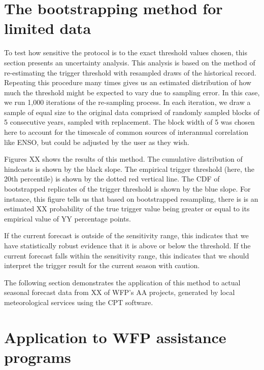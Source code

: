 \documentclass{ametsocV5}
\begin{document}
\section{The bootstrapping method for limited data}


To test how sensitive the protocol is to the exact threshold values chosen, this section presents an uncertainty analysis. This analysis is based on the method of re-estimating the trigger threshold with resampled draws of the historical record. Repeating this procedure many times gives us an estimated distribution of how much the threshold might be expected to vary due to sampling error. In this case, we run 1,000 iterations of the re-sampling process. In each iteration, we draw a sample of equal size to the original data comprised of randomly sampled blocks of 5 consecutive years, sampled with replacement. The block width of 5 was chosen here to account for the timescale of common sources of interannual correlation like ENSO, but could be adjusted by the user as they wish. 

Figures XX shows the results of this method. The cumulative distribution of hindcasts is shown by the black slope. The empirical trigger threshold (here, the 20th percentile) is shown by the dotted red vertical line. The CDF of bootstrapped replicates of the trigger threshold is shown by the blue slope. For instance, this figure tells us that based on bootstrapped resampling, there is is an estimated XX probability of the true trigger value being greater or equal to its empirical value of YY percentage points. 

If the current forecast is outside of the sensitivity range, this indicates that we have statistically robust evidence that it is above or below the threshold. If the current forecast falls within the sensitivity range, this indicates that we should interpret the trigger result for the current season with caution.

The following section demonstrates the application of this method to actual seasonal forecast data from XX of WFP's AA projects, generated by local meteorological services using the CPT software. 

\section{Application to WFP assistance programs}
\end{document}
